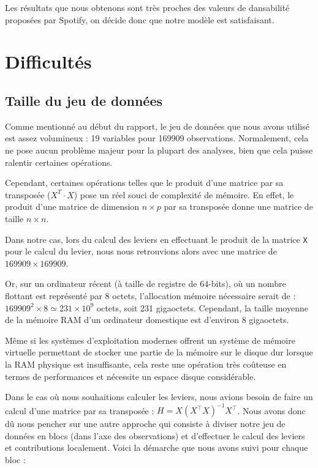 \documentclass[a4paper, 12pt]{report}
\newcommand{\pythoninline}[1]{\texttt{#1}}
\begin{document}
Les résultats que nous obtenons sont très proches des valeurs de dansabilité proposées par Spotify, on décide donc que notre modèle est satisfaisant.

\chapter{Difficultés}

\section{Taille du jeu de données}

Comme mentionné au début du rapport, le jeu de données que nous avons utilisé est assez volumineux : 19 variables pour 169909 observations. Normalement, cela ne pose aucun problème majeur pour la plupart des analyses, bien que cela puisse ralentir certaines opérations.

Cependant, certaines opérations telles que le produit d'une matrice par sa transposée (\(X^{T}\cdot X\)) pose un réel souci de complexité de mémoire. En effet, le produit d'une matrice de dimension \(n\times p\) par sa transposée donne une matrice de taille \(n\times n\).

Dans notre cas, lors du calcul des leviers en effectuant le produit de la matrice \pythoninline{X} pour le calcul du levier, nous nous retrouvions alors avec une matrice de \(169909\times169909\).

Or, sur un ordinateur récent (à taille de registre de 64-bits), où un nombre flottant est représenté par 8 octets, l'allocation mémoire nécessaire serait de : \(169909^{2}\times 8\simeq231\times10^{9}\) octets, soit 231 gigaoctets. Cependant, la taille moyenne de la mémoire RAM d'un ordinateur domestique est d'environ 8 gigaoctets.

Même si les systèmes d'exploitation modernes offrent un système de mémoire virtuelle permettant de stocker une partie de la mémoire sur le disque dur lorsque la RAM physique est insuffisante, cela reste une opération très coûteuse en termes de performances et nécessite un espace disque considérable.

Dans le cas où nous souhaitions calculer les leviers, nous avions besoin de faire un calcul d'une matrice par sa transposée : \(H = X (X^\top X)^{-1}X^\top\). Nous avons donc dû nous pencher sur une autre approche qui consiste à diviser notre jeu de données en blocs (dans l'axe des observations) et d'effectuer le calcul des leviers et contributions localement. Voici la démarche que nous avons suivi pour chaque bloc :
\end{document}
